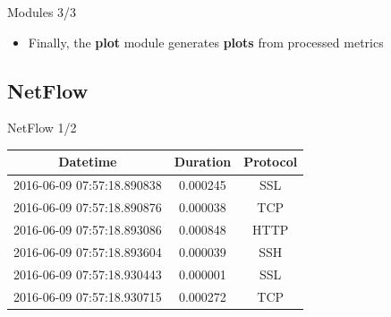 \documentclass{beamer}
\begin{document}
	\begin{frame}{Modules 3/3}
		\begin{minipage}{.5\textwidth}
	    	\begin{itemize}
	    		\item Finally, the \textbf{plot} module generates \textbf{plots} from processed metrics
	    	\end{itemize}
		\end{minipage}%
		\begin{minipage}{.6\textwidth}
			\begin{figure}
				\centering
			\end{figure}
		\end{minipage}
	\end{frame}
	
	\subsection{NetFlow}
	
	\begin{frame}{NetFlow 1/2}
		\begin{longtable}[h]{c c c}
			\hline
			\textbf{Datetime} & \textbf{Duration} & \textbf{Protocol} \\ \hline \hline
			2016-06-09 07:57:18.890838 & 0.000245 & SSL \\ \hline
			2016-06-09 07:57:18.890876 & 0.000038 & TCP \\ \hline
			2016-06-09 07:57:18.893086 & 0.000848 & HTTP \\ \hline
			2016-06-09 07:57:18.893604 & 0.000039 & SSH \\ \hline
			2016-06-09 07:57:18.930443 & 0.000001 & SSL \\ \hline
			2016-06-09 07:57:18.930715 & 0.000272 & TCP \\ \hline
		\end{longtable}
	\end{frame}
	
\end{document}
